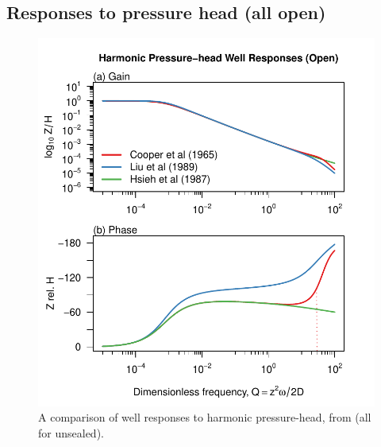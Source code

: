 \documentclass[12pt]{article}\usepackage[]{graphicx}\usepackage[]{color}
\makeatletter
\def\maxwidth{ %
  \ifdim\Gin@nat@width>\linewidth
    \linewidth
  \else
    \Gin@nat@width
  \fi
}
\newenvironment{knitrout}{}{} %
\makeatother
\begin{document}
\subsection{Responses to pressure head (all open)}
\begin{figure}[htb!]
\begin{center}
\begin{knitrout}\small
{}\color{fgcolor}
\includegraphics[width=\maxwidth]{figure/ALLORESPFIG-1} 

\end{knitrout}
\caption{A comparison of well responses to harmonic pressure-head, 
from \citet{cooper1965, hsieh1987, liu1989} (all for unsealed).}
\label{fig:owrsp-all}
\end{center}
\end{figure}



\end{document}
